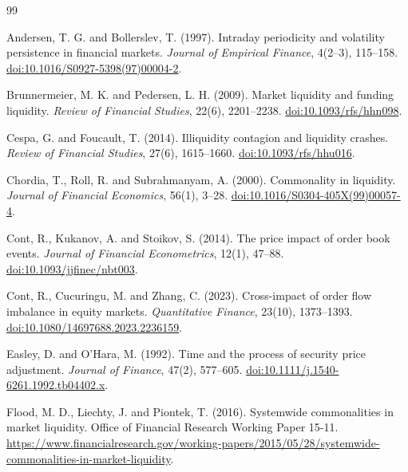 \documentclass[12pt,a4paper]{article}
\newcommand{\doi}[1]{\href{https://doi.org/#1}{doi:#1}}
\begin{document}
\FloatBarrier

\clearpage
{}
{}
\begingroup
\raggedright
\begin{thebibliography}{99}

Andersen, T. G.  and Bollerslev, T. (1997).
\newblock Intraday periodicity and volatility persistence in financial markets.
\newblock \emph{Journal of Empirical Finance}, 4(2--3), 115--158.
\newblock \doi{10.1016/S0927-5398(97)00004-2}.

Brunnermeier, M. K.  and Pedersen, L. H. (2009).
\newblock Market liquidity and funding liquidity.
\newblock \emph{Review of Financial Studies}, 22(6), 2201--2238.
\newblock \doi{10.1093/rfs/hhn098}.

Cespa, G.  and Foucault, T. (2014).
\newblock Illiquidity contagion and liquidity crashes.
\newblock \emph{Review of Financial Studies}, 27(6), 1615--1660.
\newblock \doi{10.1093/rfs/hhu016}.

Chordia, T., Roll, R.  and Subrahmanyam, A. (2000).
\newblock Commonality in liquidity.
\newblock \emph{Journal of Financial Economics}, 56(1), 3--28.
\newblock \doi{10.1016/S0304-405X(99)00057-4}.

Cont, R., Kukanov, A.  and Stoikov, S. (2014).
\newblock The price impact of order book events.
\newblock \emph{Journal of Financial Econometrics}, 12(1), 47--88.
\newblock \doi{10.1093/jjfinec/nbt003}.

Cont, R., Cucuringu, M.  and Zhang, C. (2023).
\newblock Cross-impact of order flow imbalance in equity markets.
\newblock \emph{Quantitative Finance}, 23(10), 1373--1393.
\newblock \doi{10.1080/14697688.2023.2236159}.

Easley, D.  and O'Hara, M. (1992).
\newblock Time and the process of security price adjustment.
\newblock \emph{Journal of Finance}, 47(2), 577--605.
\newblock \doi{10.1111/j.1540-6261.1992.tb04402.x}.

Flood, M. D., Liechty, J.  and Piontek, T. (2016).
\newblock Systemwide commonalities in market liquidity.
\newblock Office of Financial Research Working Paper 15-11.
\newblock \url{https://www.financialresearch.gov/working-papers/2015/05/28/systemwide-commonalities-in-market-liquidity}.


\end{thebibliography}
\end{document}
